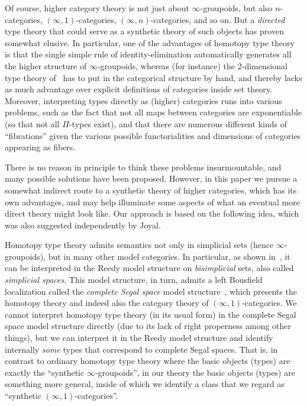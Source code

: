 \documentclass{amsart}
\theoremstyle{plain}
\theoremstyle{definition}
\theoremstyle{remark}
\numberwithin{equation}{section}
\begin{document}
Of course, higher category theory is not just about $\infty$-groupoids, but also $n$-categories, $(\infty,1)$-categories, $(\infty,n)$-categories, and so on.
But a \emph{directed} type theory that could serve as a synthetic theory of such objects has proven somewhat elusive.
In particular, one of the advantages of homotopy type theory is that the single simple rule of identity-elimination automatically generates all the higher structure of $\infty$-groupoids, whereas (for instance) the 2-dimensional type theory of~\cite{2dtt} has to put in the categorical structure by hand, and thereby lacks as much advantage over explicit definitions of categories inside set theory.
Moreover, interpreting types directly as (higher) categories runs into various problems, such as the fact that not all maps between categories are exponentiable (so that not all $\Pi$-types exist), and that there are numerous different kinds of ``fibrations'' given the various possible functorialities and dimensions of categories appearing as fibers.

There is no reason in principle to think these problems insurmountable, and many possible solutions have been proposed.
However, in this paper we pursue a somewhat indirect route to a synthetic theory of higher categories, which has its own advantages, and may help illuminate some aspects of what an eventual more direct theory might look like.
Our approach is based on the following idea, which was also suggested independently by Joyal.

Homotopy type theory admits semantics not only in simplicial sets (hence $\infty$-groupoids), but in many other model categories.
In particular, as shown in~\cite{elreedy}, it can be interpreted in the Reedy model structure on \emph{bisimplicial} sets, also called \emph{simplicial spaces}.
This model structure, in turn, admits a left Bousfield localization called the \emph{complete Segal space} model structure~\cite{css}, which presents the homotopy theory and indeed also the category theory \cite{RV4} of $(\infty,1)$-categories.
We cannot interpret homotopy type theory (in its usual form) in the complete Segal space model structure directly (due to its lack of right properness among other things), but we can interpret it in the Reedy model structure and identify internally \emph{some} types that correspond to complete Segal spaces.
That is, in contrast to ordinary homotopy type theory where the basic objects (types) are exactly the ``synthetic $\infty$-groupoids'', in our theory the basic objects (types) are something more general, inside of which we identify a class that we regard as ``synthetic $(\infty,1)$-categories''.
\end{document}
